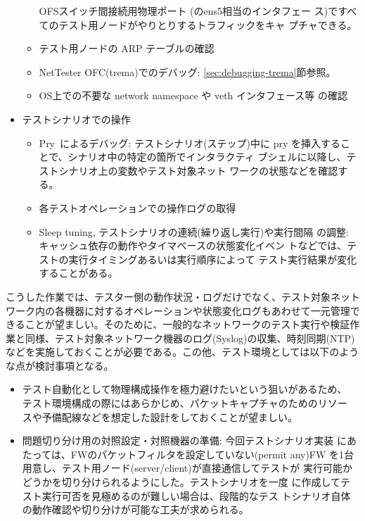 \begin{itemize}
\begin{itemize}
              OFSスイッチ間接続用物理ポート
              (のens5相当のインタフェー
              ス)ですべてのテスト用ノードがやりとりするトラフィックをキャ
              プチャできる。
        \item テスト用ノードの ARP テーブルの確認
        \item NetTester OFC(trema)でのデバッグ:
              \ref{sec:debugging-trema}節参照。
        \item OS上での不要な network namespace や veth インタフェース等
              の確認
       \end{itemize}
 \item テストシナリオでの操作
       \begin{itemize}
        \item Pry~\cite{pry}によるデバッグ: テストシナリオ(ステップ)中に
              pry を挿入することで、シナリオ中の特定の箇所でインタラクティ
              ブシェルに以降し、テストシナリオ上の変数やテスト対象ネット
              ワークの状態などを確認する。
        \item 各テストオペレーションでの操作ログの取得
        \item Sleep tuning, テストシナリオの連続(繰り返し実行)や実行間隔
              の調整: キャッシュ依存の動作やタイマベースの状態変化イベン
              トなどでは、テストの実行タイミングあるいは実行順序によって
              テスト実行結果が変化することがある。
       \end{itemize}
\end{itemize}

こうした作業では、テスター側の動作状況・ログだけでなく、テスト対象ネット
ワーク内の各機器に対するオペレーションや状態変化ログもあわせて一元管理で
きることが望ましい。そのために、一般的なネットワークのテスト実行や検証作
業と同様、テスト対象ネットワーク機器のログ(Syslog)の収集、時刻同期(NTP)
などを実施しておくことが必要である。この他、テスト環境としては以下のよう
な点が検討事項となる。
\begin{itemize}
 \item テスト自動化として物理構成操作を極力避けたいという狙いがあるため、
       テスト環境構成の際にはあらかじめ、パケットキャプチャのためのリソー
       スや予備配線などを想定した設計をしておくことが望ましい。
 \item 問題切り分け用の対照設定・対照機器の準備: 今回テストシナリオ実装
       にあたっては、FWのパケットフィルタを設定していない(permit any)FW
       を1台用意し、テスト用ノード(server/client)が直接通信してテストが
       実行可能かどうかを切り分けられるようにした。テストシナリオを一度
       に作成してテスト実行可否を見極めるのが難しい場合は、段階的なテス
       トシナリオ自体の動作確認や切り分けが可能な工夫が求められる。
\end{itemize}

